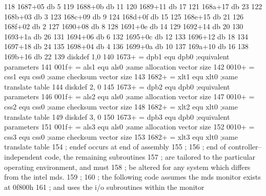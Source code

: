 118      1687+05                   db       5
119      1688+0b                   db       11
120      1689+11                   db       17
121      168a+17                   db       23
122      168b+03                   db       3
123      168c+09                   db       9
124      168d+0f                   db       15
125      168e+15                   db       21
126      168f+02                   db       2
127      1690+08                   db       8
128      1691+0e                   db       14
129      1692+14                   db       20
130      1693+1a                   db       26
131      1694+06                   db       6
132      1695+0c                   db       12
133      1696+12                   db       18
134      1697+18                   db       24
135      1698+04                   db       4
136      1699+0a                   db       10
137      169a+10                   db       16
138      169b+16                   db       22
139                                diskdef  1,0
140      1673+ =          dpb1     equ      dpb0       ;equivalent parameters
141      001f+ =          als1     equ      als0       ;same allocation vector size
142      0010+ =          css1     equ      css0       ;same checksum vector size
143      1682+ =          xlt1     equ      xlt0       ;same translate table
144                                diskdef  2, 0
145      1673+ =          dpb2     equ      dpb0       ;equivalent parameters
146      001f+ =          als2     equ      als0       ;same allocation vector size
147      0010+ =          css2     equ      css0       ;same checksum vector size
148      1682+ =          xlt2     equ      xlt0       ;same translate table
149                                diskdef  3, 0
150      1673+ =          dpb3     equ      dpb0       ;equivalent parameters
151      001f+ =          als3     equ      als0       ;same allocation vector size
152      0010+ =          css3     equ      css0       ;same checksum vector size
153      1682+ =          xlt3     equ      xlt0       ;same translate table
154                       ;        endef occurs at end of assembly
155                       ;
156                       ;        end of controller--independent code, the remaining subroutines
157                       ;        are tailored to the particular operating environment, and must
158                       ;        be altered for any system which differs from the intel mds.
159                       ;
160                       ;        the following code assumes the mds monitor exists at 0f800h
161                       ;        and uses the i/o subroutines within the monitor
